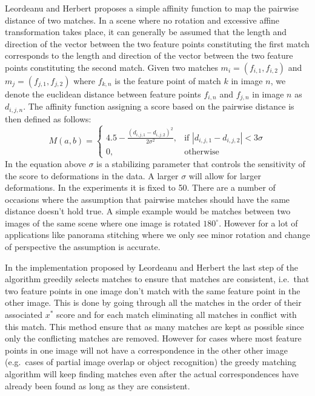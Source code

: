 Leordeanu and Herbert proposes a simple affinity function to map the 
pairwise distance of two matches. In a scene where no rotation and 
excessive affine transformation takes place, it can generally be assumed 
that the length and direction of the vector between
the two feature points constituting the first match corresponds to the 
length and direction of the vector between the two feature points 
constituting the second match. Given two matches $m_i = (f_{i,1}, 
f_{i,2})$ and $m_j = (f_{j,1},f_{j,2})$ where $f_{k,n}$ is the feature 
point of match $k$ in image $n$, we denote the euclidean distance 
between feature points $f_{i,n}$ and $f_{j,n}$ in image $n$ as 
$d_{i,j,n}$.  The affinity function assigning a score based on the 
pairwise distance is then defined as follows:
\begin{equation*}
    M(a,b) = \begin{cases} 4.5 - \frac{\left(d_{i,j,1} - 
        d_{i,j,2}\right)^2}{2\sigma^2}, & \mbox{if } \left\vert 
                d_{i,j,1} - d_{i,j,2} \right\vert < 3\sigma \\ 0, & 
                \mbox{otherwise}
	\end{cases}
\end{equation*}
In the equation above $\sigma$ is a stabilizing parameter that controls 
the sensitivity of the score to deformations in the data. A larger 
$\sigma$ will allow for larger deformations. In the experiments it is 
fixed to 50. There are a number of occasions where the assumption that 
pairwise matches should have the same distance doesn't hold true.  A 
simple example would be matches between two images of the same scene 
where one image is rotated $180^{\circ}$.  However for a lot of 
applications like panorama stitching where we only see minor rotation 
and change of perspective the assumption is accurate.

In the implementation proposed by Leordeanu and Herbert 
\cite{leordeanu2005spectral} the last step of the algorithm greedily 
selects matches to ensure that matches are consistent, i.e.\ that two 
feature points in one image don't match with the same feature point in 
the other image. This is done by going through all the matches in the 
order of their associated $x^{*}$ score and for each match eliminating 
all matches in conflict with this match. This method ensure that as many
matches are kept as possible since only the conflicting matches are 
removed. However for cases where most feature points in one image will 
not have a correspondence in the other other image (e.g.\ cases of 
partial image overlap or object recognition) the greedy matching 
algorithm will keep finding matches even after the actual 
correspondences have already been found as long as they are consistent.

